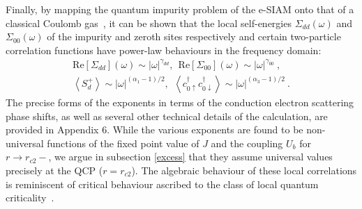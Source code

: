 Finally, by mapping the quantum impurity problem of the e-SIAM onto that of a classical Coulomb gas~\cite{anderson1969exact,si_kotliar_1993}, it can be shown that the local self-energies \(\Sigma_{dd}(\omega)\) and \(\Sigma_{00}(\omega)\) of the impurity and zeroth sites respectively and certain two-particle correlation functions have power-law behaviours in the frequency domain:
\begin{eqnarray}\label{exponents}
	\text{Re}\left[\Sigma_{dd}\right](\omega) \sim |\omega|^{\gamma_{dd}}, ~ ~\text{Re}\left[\Sigma_{00}\right](\omega) \sim |\omega|^{\gamma_{00}}~,\\
\left<S_d^+\right> \sim |\omega|^{(\alpha_1 - 1)/2}, ~ ~\left<c^\dagger_{0 \uparrow} c^\dagger_{ 0\downarrow}\right> \sim |\omega|^{(\alpha_3 - 1)/2}~.
\end{eqnarray}
The precise forms of the exponents in terms of the conduction electron scattering phase shifts, as well as several other technical details of the calculation, are provided in Appendix 6. While the various exponents are found to be non-universal functions of the fixed point value of $J$ and the coupling $U_{b}$ for $r\to r_{c2}-$, we argue in subsection \eqref{excess} that they assume universal values precisely at the QCP ($r=r_{c2}$). The algebraic behaviour of these local correlations
is reminiscent of critical behaviour ascribed to the class of local quantum criticality~\cite{Coleman_Si_2001,Si2001}. 


